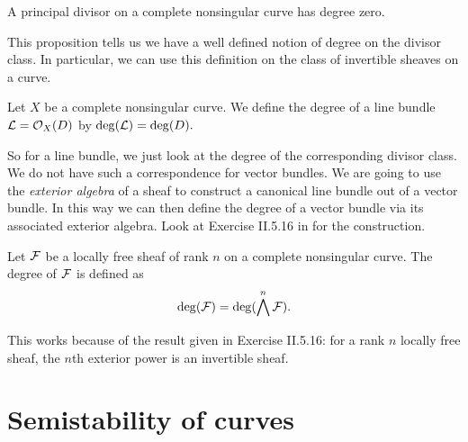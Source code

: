 \begin{proposition}
	A principal divisor on a complete nonsingular curve has degree zero.
\end{proposition}

This proposition tells us we have a well defined notion of degree on the divisor class. In particular, we can use this definition on the class of invertible sheaves on a curve.

\begin{definition}
	Let $X$ be a complete nonsingular curve. We define the degree of a line bundle $\mathcal{L} = \mathcal{O}_X(D)$ by $
    	\deg(\mathcal{L}) = \deg(D).$ 
\end{definition}

So for a line bundle, we just look at the degree of the corresponding divisor class. We do not have such a correspondence for vector bundles. We are going to use the \emph{exterior algebra} of a sheaf to construct a canonical line bundle out of a vector bundle. In this way we can then define the degree of a vector bundle via its associated exterior algebra. Look at Exercise II.5.16 in \cite{hartshorne2013algebraic} for the construction.

\begin{definition}
	Let $\mathcal{F}$ be a locally free sheaf of rank $n$ on a complete nonsingular curve.
	The degree of $\mathcal{F}$ is defined as \[\deg(\mathcal{F}) = \deg(\bigwedge^n \mathcal{F}).\]
\end{definition}

This works because of the result given in Exercise II.5.16: for a rank $n$ locally free sheaf, the $n$th exterior power is an invertible sheaf.

\section{Semistability of curves}
